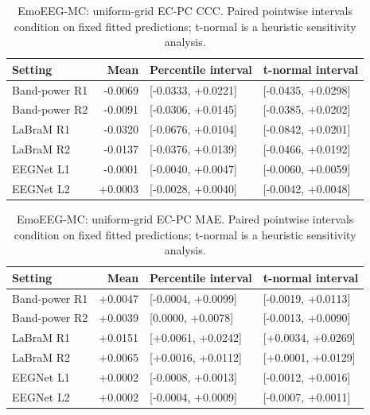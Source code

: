 \begin{table}[htbp]\centering\small
\caption{EmoEEG-MC: uniform-grid EC-PC CCC. Paired pointwise intervals condition on fixed fitted predictions; t-normal is a heuristic sensitivity analysis.}
\begin{tabular}{@{}lrll@{}}\toprule
Setting & Mean & Percentile interval & t-normal interval \\
\midrule
Band-power R1 & -0.0069 & [-0.0333, +0.0221] & [-0.0435, +0.0298] \\
Band-power R2 & -0.0091 & [-0.0306, +0.0145] & [-0.0385, +0.0202] \\
LaBraM R1 & -0.0320 & [-0.0676, +0.0104] & [-0.0842, +0.0201] \\
LaBraM R2 & -0.0137 & [-0.0376, +0.0139] & [-0.0466, +0.0192] \\
EEGNet L1 & -0.0001 & [-0.0040, +0.0047] & [-0.0060, +0.0059] \\
EEGNet L2 & +0.0003 & [-0.0028, +0.0040] & [-0.0042, +0.0048] \\
\bottomrule\end{tabular}\end{table}
\begin{table}[htbp]\centering\small
\caption{EmoEEG-MC: uniform-grid EC-PC MAE. Paired pointwise intervals condition on fixed fitted predictions; t-normal is a heuristic sensitivity analysis.}
\begin{tabular}{@{}lrll@{}}\toprule
Setting & Mean & Percentile interval & t-normal interval \\
\midrule
Band-power R1 & +0.0047 & [-0.0004, +0.0099] & [-0.0019, +0.0113] \\
Band-power R2 & +0.0039 & [0.0000, +0.0078] & [-0.0013, +0.0090] \\
LaBraM R1 & +0.0151 & [+0.0061, +0.0242] & [+0.0034, +0.0269] \\
LaBraM R2 & +0.0065 & [+0.0016, +0.0112] & [+0.0001, +0.0129] \\
EEGNet L1 & +0.0002 & [-0.0008, +0.0013] & [-0.0012, +0.0016] \\
EEGNet L2 & +0.0002 & [-0.0004, +0.0009] & [-0.0007, +0.0011] \\
\bottomrule\end{tabular}\end{table}
